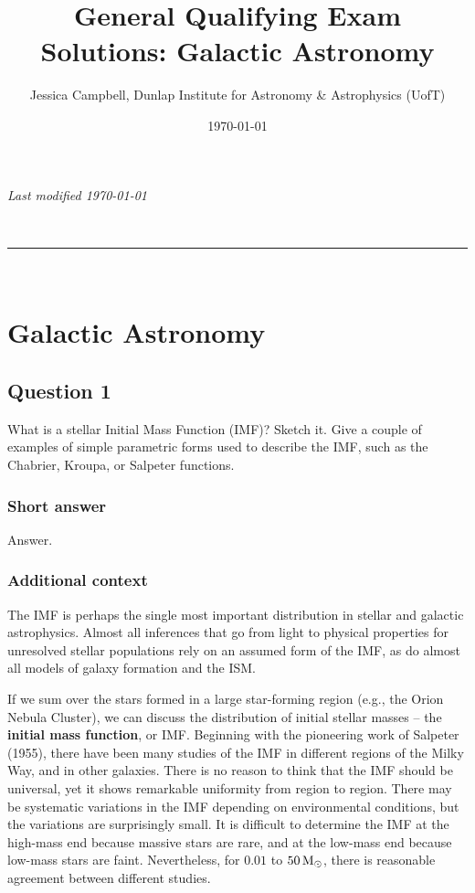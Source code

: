 \documentclass[a4paper,10pt]{article}
\makeatletter
\newcommand{\linia}{\rule{\linewidth}{0.5pt}}
\renewcommand{\maketitle}{
\begin{center}
\vspace{2ex}
{\huge \textsc{\@title}}
\vspace{1ex}
\\
\linia\\
\@author
\vspace{4ex}
\end{center}
}
\makeatother
\begin{document}
\hfill{\textit{Last modified \today}}
\title{General Qualifying Exam Solutions: Galactic Astronomy}
\author{Jessica Campbell, Dunlap Institute for Astronomy \& Astrophysics (UofT)}
\date{\today}
\maketitle

\tableofcontents



%
%
%
%

\newpage
\section{Galactic Astronomy}


\subsection{Question 1}

What is a stellar Initial Mass Function (IMF)? Sketch it. Give a couple of examples of simple parametric forms used to describe the IMF, such as the Chabrier, Kroupa, or Salpeter functions.

\subsubsection{Short answer}

Answer.

\subsubsection{Additional context}

The IMF is perhaps the single most important distribution in stellar and galactic astrophysics. Almost all inferences that go from light to physical properties for unresolved stellar populations rely on an assumed form of the IMF, as do almost all models of galaxy formation and the ISM.

{\noindent}If we sum over the stars formed in a large star-forming region (e.g., the Orion Nebula Cluster), we can discuss the distribution of initial stellar masses -- the \textbf{initial mass function}, or IMF. Beginning with the pioneering work of Salpeter (1955), there have been many studies of the IMF in different regions of the Milky Way, and in other galaxies. There is no reason to think that the IMF should be universal, yet it shows remarkable uniformity from region to region. There may be systematic variations in the IMF depending on environmental conditions, but the variations are surprisingly small. It is difficult to determine the IMF at the high-mass end because massive stars are rare, and at the low-mass end because low-mass stars are faint. Nevertheless, for $0.01$ to $50\,{\rm M_\odot}$, there is reasonable agreement between different studies.
\end{document}
